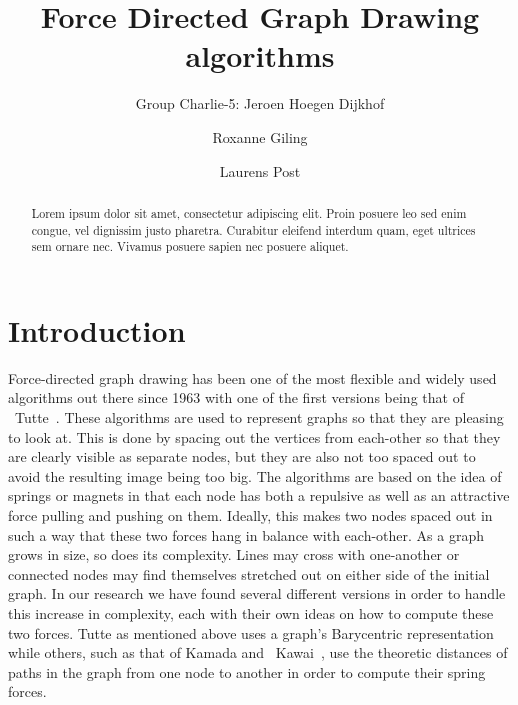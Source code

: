 \documentclass[a4paper,12pt,twoside]{article}
\begin{document}
\title{Force Directed Graph Drawing algorithms}
\author{Group Charlie-5: Jeroen Hoegen Dijkhof \and Roxanne Giling \and Laurens Post}
\maketitle
\begin{abstract}
Lorem ipsum dolor sit amet, consectetur adipiscing elit. Proin posuere leo sed enim congue, vel dignissim justo pharetra. Curabitur eleifend interdum quam, eget ultrices sem ornare nec. Vivamus posuere sapien nec posuere aliquet.
\end{abstract}
\newpage

\tableofcontents
\newpage

\section{Introduction}\label{s:Introduction}
Force-directed graph drawing has been one of the most flexible and widely used algorithms out there since 1963 with one of the first versions being that of ~Tutte~\cite{Tutte}. These algorithms are used to represent graphs so that they are pleasing to look at. This is done by spacing out the vertices from each-other so that they are clearly visible as separate nodes, but they are also not too spaced out to avoid the resulting image being too big. The algorithms are based on the idea of springs or magnets in that each node has both a repulsive as well as an attractive force pulling and pushing on them. Ideally, this makes two nodes spaced out in such a way that these two forces hang in balance with each-other. As a graph grows in size, so does its complexity. Lines may cross with one-another or connected nodes may find themselves stretched out on either side of the initial graph. In our research we have found several different versions in order to handle this increase in complexity, each with their own ideas on how to compute these two forces. Tutte as mentioned above uses a graph's Barycentric representation while others, such as that of Kamada and ~Kawai~\cite{Kawai}, use the theoretic distances of paths in the graph from one node to another in order to compute their spring forces.
\end{document}
